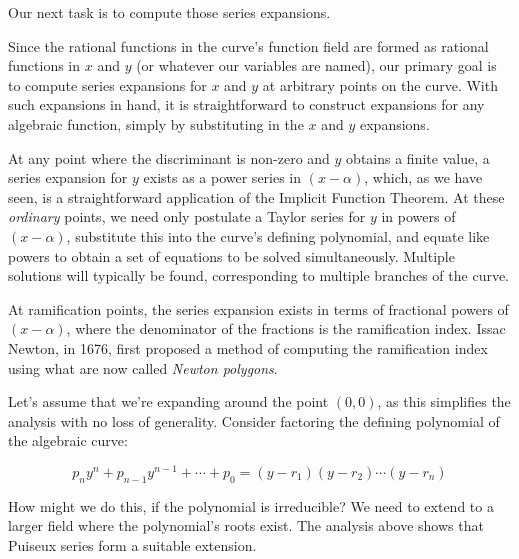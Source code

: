 Our next task is to compute those series expansions.

Since the rational functions in the curve's function field are
formed as rational functions in $x$ and $y$ (or whatever our
variables are named), our primary goal is to compute
series expansions for $x$ and $y$ at arbitrary points on the curve.  With such
expansions in hand, it is straightforward to construct expansions for
any algebraic function, simply by substituting in the $x$ and $y$ expansions.


At any point where the discriminant is non-zero and $y$ obtains a
finite value, a series expansion for $y$ exists as a power series in
$(x-\alpha)$, which, as we have seen, is a straightforward application
of the Implicit Function Theorem.  At these {\it ordinary} points, we
need only postulate a Taylor series for $y$ in powers of $(x-\alpha)$,
substitute this into the curve's defining polynomial, and equate like
powers to obtain a set of equations to be solved simultaneously.
Multiple solutions will typically be found, corresponding to multiple
branches of the curve.


At ramification points, the series expansion exists in terms
of fractional powers of $(x-\alpha)$, where the denominator
of the fractions is the ramification index.  Issac Newton,
in 1676, first proposed a method of computing the ramification index
using what are now called {\it Newton polygons}.



Let's assume that we're expanding around the point $(0,0)$, as this
simplifies the analysis with no loss of generality.  Consider
factoring the defining polynomial of the algebraic curve:

$$p_n y^n + p_{n-1}y^{n-1} + \cdots + p_0 = (y-r_1)(y-r_2)\cdots(y-r_n)$$

How might we do this, if the polynomial is irreducible?  We need to
extend to a larger field where the polynomial's roots exist.  The
analysis above shows that Puiseux series form a suitable extension.

